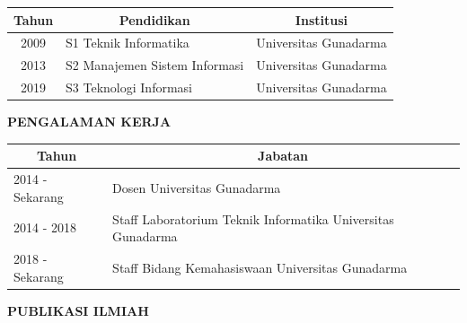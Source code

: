 \begin{table}[H]
		\centering
	\label{tab:my-table}
	\begin{longtable}{|c|l|p{5cm}|}
		\hline
		\textbf{Tahun} & \multicolumn{1}{c|}{\textbf{Pendidikan}} & \multicolumn{1}{c|}{\textbf{Institusi}} \\ \hline
		2009 & S1 Teknik Informatika & Universitas Gunadarma         \\ \hline
		2013 & S2 Manajemen  Sistem Informasi & Universitas Gunadarma  \\ \hline
		2019 & S3 Teknologi Informasi & Universitas Gunadarma \\ \hline
	\end{longtable}%
		\centering	
\end{table}

\newpage
\noindent \textbf{PENGALAMAN KERJA}
\vspace{0.2cm}


\begin{table}[H]
		\centering
	\begin{tabular}{|l|p{11.5cm}|}
		\hline
		\multicolumn{1}{|c|}{\textbf{Tahun}} & \multicolumn{1}{c|}{\textbf{Jabatan}}                      \\ \hline
		2014 - Sekarang & Dosen Universitas Gunadarma  \\ \hline
		2014 - 2018 &  Staff Laboratorium Teknik Informatika Universitas Gunadarma \\ \hline
		2018 - Sekarang     &  Staff Bidang Kemahasiswaan Universitas Gunadarma \\ \hline
	\end{tabular}%
		\centering
\end{table}


\vspace{0.5cm}
\noindent \textbf{PUBLIKASI ILMIAH}
\vspace{0.2cm}


